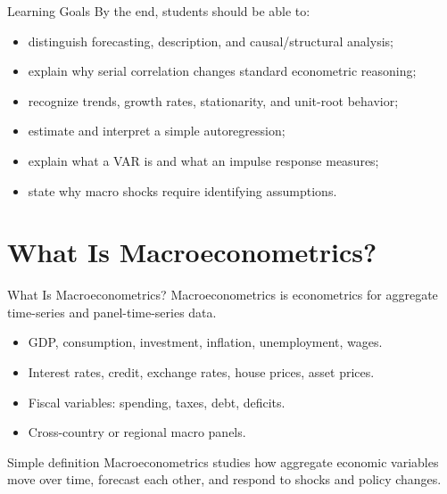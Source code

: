 \documentclass[11pt,aspectratio=169]{beamer}
\begin{document}
\begin{frame}{Learning Goals}
  By the end, students should be able to:
  \begin{itemize}
    \item distinguish forecasting, description, and causal/structural analysis;
    \item explain why serial correlation changes standard econometric reasoning;
    \item recognize trends, growth rates, stationarity, and unit-root behavior;
    \item estimate and interpret a simple autoregression;
    \item explain what a VAR is and what an impulse response measures;
    \item state why macro shocks require identifying assumptions.
  \end{itemize}
\end{frame}

\section{What Is Macroeconometrics?}

\begin{frame}{What Is Macroeconometrics?}
  Macroeconometrics is econometrics for aggregate time-series and panel-time-series data.

  \begin{itemize}
    \item GDP, consumption, investment, inflation, unemployment, wages.
    \item Interest rates, credit, exchange rates, house prices, asset prices.
    \item Fiscal variables: spending, taxes, debt, deficits.
    \item Cross-country or regional macro panels.
  \end{itemize}

  \begin{block}{Simple definition}
    Macroeconometrics studies how aggregate economic variables move over time, forecast each other, and respond to shocks and policy changes.
  \end{block}
\end{frame}
\end{document}
